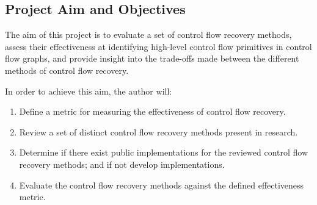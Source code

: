 
\subsection{Project Aim and Objectives}

The aim of this project is to evaluate a set of control flow recovery methods, assess their effectiveness at identifying high-level control flow primitives in control flow graphs, and provide insight into the trade-offs made between the different methods of control flow recovery.

In order to achieve this aim, the author will:

\begin{enumerate}
	\item \label{itm:obj_define_effectiveness_metric} Define a metric for measuring the effectiveness of control flow recovery.
	\item \label{itm:obj_review_cfa_methods} Review a set of distinct control flow recovery methods present in research.
	\item \label{itm:obj_cfa_components} Determine if there exist public implementations for the reviewed control flow recovery methods; and if not develop implementations.
	\item \label{itm:obj_cfa_evaluation} Evaluate the control flow recovery methods against the defined effectiveness metric.
\end{enumerate}
